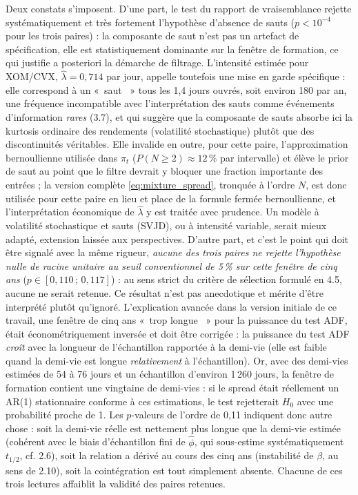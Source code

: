 \documentclass{article}
\providecommand{\og}{«~}
\providecommand{\fg}{~»}
\begin{document}
Deux constats s'imposent. D'une part, le test du rapport de vraisemblance rejette systématiquement et très fortement l'hypothèse d'absence de sauts ($p<10^{-4}$ pour les trois paires) : la composante de saut n'est pas un artefact de spécification, elle est statistiquement dominante sur la fenêtre de formation, ce qui justifie a posteriori la démarche de filtrage. L'intensité estimée pour XOM/CVX, $\hat\lambda=0{,}714$ par jour, appelle toutefois une mise en garde spécifique : elle correspond à un \og saut \fg{} tous les 1{,}4 jours ouvrés, soit environ 180 par an, une fréquence incompatible avec l'interprétation des sauts comme événements d'information \emph{rares} (3.7), et qui suggère que la composante de sauts absorbe ici la kurtosis ordinaire des rendements (volatilité stochastique) plutôt que des discontinuités véritables. Elle invalide en outre, pour cette paire, l'approximation bernoullienne utilisée dans $\pi_t$ ($P(N\geq 2)\approx 12\,\%$ par intervalle) et élève le prior de saut au point que le filtre devrait y bloquer une fraction importante des entrées ; la version complète \eqref{eq:mixture_spread}, tronquée à l'ordre $N$, est donc utilisée pour cette paire en lieu et place de la formule fermée bernoullienne, et l'interprétation économique de $\hat\lambda$ y est traitée avec prudence. Un modèle à volatilité stochastique et sauts (SVJD), ou à intensité variable, serait mieux adapté, extension laissée aux perspectives. D'autre part, et c'est le point qui doit être signalé avec la même rigueur, \emph{aucune des trois paires ne rejette l'hypothèse nulle de racine unitaire au seuil conventionnel de 5\,\% sur cette fenêtre de cinq ans} ($p\in[0{,}110\,;\,0{,}117]$) : au sens strict du critère de sélection formulé en 4.5, aucune ne serait retenue.
Ce résultat n'est pas anecdotique et mérite d'être interprété plutôt qu'ignoré. L'explication avancée dans la version initiale de ce travail, une fenêtre de cinq ans \og trop longue \fg{} pour la puissance du test ADF, était économétriquement inversée et doit être corrigée : la puissance du test ADF \emph{croît} avec la longueur de l'échantillon rapportée à la demi-vie (elle est faible quand la demi-vie est longue \emph{relativement} à l'échantillon). Or, avec des demi-vies estimées de 54 à 76 jours et un échantillon d'environ 1\,260 jours, la fenêtre de formation contient une vingtaine de demi-vies : si le spread était réellement un AR(1) stationnaire conforme à ces estimations, le test rejetterait $H_0$ avec une probabilité proche de 1. Les $p$-valeurs de l'ordre de 0{,}11 indiquent donc autre chose : soit la demi-vie réelle est nettement plus longue que la demi-vie estimée (cohérent avec le biais d'échantillon fini de $\hat\phi$, qui sous-estime systématiquement $t_{1/2}$, cf. 2.6), soit la relation a dérivé au cours des cinq ans (instabilité de $\beta$, au sens de 2.10), soit la cointégration est tout simplement absente. Chacune de ces trois lectures affaiblit la validité des paires retenues.
\end{document}
